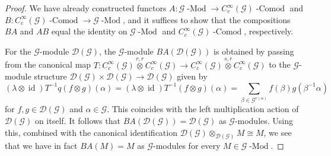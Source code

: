 \documentclass{amsart}
\newcommand{\G}{\mathcal{G}}
\newcommand{\DG}{\mathcal{D}(\mathcal{G})}
\newcommand{\ccinfty}{C_c^\infty}
\DeclareMathOperator{\id}{id}
\begin{document}
\begin{proof}
We have already constructed functors $ A: \G \operatorname{-Mod} \rightarrow \ccinfty(\G) \operatorname{-Comod} $ and $ B: \ccinfty(\G) \operatorname{-Comod} \rightarrow \G \operatorname{-Mod} $, and it suffices to show that the compositions $ B A $ and $ A B $ equal the identity on $ \G \operatorname{-Mod} $ and $ \ccinfty(\G) \operatorname{-Comod} $, respectively. 

For the $ \G $-module $ \DG $, the $ \G $-module $ BA(\DG) $ is obtained by passing from the canonical map $ T: \ccinfty(\G) \stackrel{r,r}{\otimes} \ccinfty(\G)\rightarrow \ccinfty(\G)\stackrel{s,r}{\otimes} \ccinfty(\G) $ to the $ \G $-module structure $ \DG \times \DG \rightarrow \DG $ given by 
$$
(\lambda \otimes \id)T^{-1} q(f \otimes g)(\alpha) = (\lambda \otimes \id)T^{-1}(f \otimes g)(\alpha) = \sum_{\beta \in \G^{r(\alpha)}} f(\beta) g(\beta^{-1} \alpha)
$$
for $f,g\in\DG$ and $\alpha\in \G$.
This coincides with the left multiplication action of $ \DG $ on itself. It follows that $ BA(\DG) = \DG $ as $ \G $-modules. Using this, combined with the canonical identification $ \DG \otimes_{\DG} M \cong M $, we see that we have in fact $ BA(M) = M $ as $ \G $-modules for every $ M \in \G \operatorname{-Mod} $. 


\end{proof}
\end{document}
